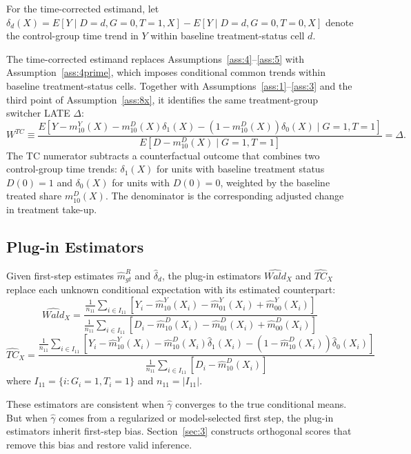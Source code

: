 For the time-corrected estimand, let $\delta_d(X) = E[Y \mid D=d, G=0, T=1, X] - E[Y \mid D=d, G=0, T=0, X]$ denote the control-group time trend in $Y$ within baseline treatment-status cell $d$.

The time-corrected estimand replaces Assumptions~\ref{ass:4}--\ref{ass:5} with Assumption~\ref{ass:4prime}, which imposes conditional common trends within baseline treatment-status cells. Together with Assumptions~\ref{ass:1}--\ref{ass:3} and the third point of Assumption~\ref{ass:8x}, it identifies the same treatment-group switcher LATE $\Delta$:
\begin{equation}\label{eq:Wtc}
    W^{TC} \equiv \frac{E[Y - m^Y_{10}(X) - m^D_{10}(X)\delta_1(X) - (1-m^D_{10}(X))\delta_0(X)\mid G=1, T=1]}{E[D - m^D_{10}(X)\mid G=1, T=1]} = \Delta.
\end{equation}
The TC numerator subtracts a counterfactual outcome that combines two control-group time trends: $\delta_1(X)$ for units with baseline treatment status $D(0)=1$ and $\delta_0(X)$ for units with $D(0)=0$, weighted by the baseline treated share $m^D_{10}(X)$. The denominator is the corresponding adjusted change in treatment take-up.

\subsection{Plug-in Estimators}\label{sec:2c}

Given first-step estimates $\hat{m}^R_{gt}$ and $\hat{\delta}_d$, the plug-in estimators $\widehat{Wald}_X$ and $\widehat{TC}_X$ replace each unknown conditional expectation with its estimated counterpart:
\begin{equation*}
    \widehat{Wald}_X = \frac{\frac{1}{n_{11}} \sum_{i \in I_{11}}[Y_i - \hat{m}^Y_{10}(X_i) - \hat{m}^Y_{01}(X_i) + \hat{m}^Y_{00}(X_i)]}{\frac{1}{n_{11}} \sum_{i \in I_{11}}[D_i - \hat{m}^D_{10}(X_i) - \hat{m}^D_{01}(X_i) + \hat{m}^D_{00}(X_i)]}
\end{equation*}
\begin{equation*}
    \widehat{TC}_X = \frac{\frac{1}{n_{11}} \sum_{i \in I_{11}}[Y_i - \hat{m}^Y_{10}(X_i) - \hat{m}^D_{10}(X_i)\hat{\delta}_1(X_i) - (1-\hat{m}^D_{10}(X_i))\hat{\delta}_0(X_i)]}{\frac{1}{n_{11}} \sum_{i \in I_{11}}[D_i - \hat{m}^D_{10}(X_i)]}
\end{equation*}
where $I_{11}=\{i: G_i=1, T_i=1\}$ and $n_{11}=|I_{11}|$.

These estimators are consistent when $\hat\gamma$ converges to the true conditional means. But when $\hat\gamma$ comes from a regularized or model-selected first step, the plug-in estimators inherit first-step bias. Section~\ref{sec:3} constructs orthogonal scores that remove this bias and restore valid inference.
